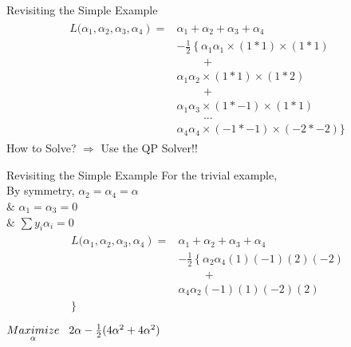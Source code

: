 \documentclass{beamer}
\begin{document}
\begin{frame}{Revisiting the Simple Example}
\begin{align*}
\begin{aligned}
\left.L(\alpha_{1},\alpha_{2},\alpha_{3},\alpha_{4}\right)=& \alpha_{1}+\alpha_{2}+\alpha_{3}+\alpha_{4} \\
&-\frac{1}{2}\left\{\alpha_{1} \alpha_{1}\times(1*1) \times(1 * 1)\right.\\
&\hspace{1cm} + \\
& \alpha_{1} \alpha_{2} \times(1*1) \times(1*2) \\
&\hspace{1cm}+\\
& \alpha_{1} \alpha_{3} \times(1*-1)\times(1*1)\\
& \hspace{1cm} ... \\
& \alpha_4\alpha_4 \times(-1*-1)\times(-2*-2)
\}
\end{aligned}
\end{align*}
How to Solve? $\Rightarrow$ Use the QP Solver!!
\end{frame}

\begin{frame}{Revisiting the Simple Example}
For the trivial example, \\
\hspace{2cm} By symmetry, $\alpha_{2} = \alpha_{4} = \alpha $\\
\hspace{2cm} \& $\alpha_1 = \alpha_3  = 0$ \\
\hspace{2cm} \& $\sum y_i\alpha_i = 0$
\begin{align*}
\begin{aligned}
\left.L(\alpha_{1},\alpha_{2},\alpha_{3},\alpha_{4}\right)=& \alpha_{1}+\alpha_{2}+\alpha_{3}+\alpha_{4} \\
&-\frac{1}{2}\left\{\alpha_{2} \alpha_{4}(1)(-1)(2)(-2) \right. \\
&\hspace{1cm} +\\
& \alpha_{4} \alpha_{2}(-1)(1)(-2)(2) \\
\}\\
\end{aligned}
\end{align*}
\hspace{2cm} $\underset{\alpha}{Maximize} \hspace{3mm} 2\alpha - \frac{1}{2}(4\alpha^{2} + 4\alpha^{2})$
\end{frame}
\end{document}
